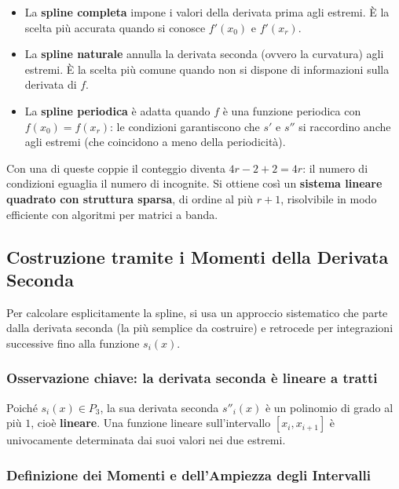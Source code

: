 \documentclass[a4paper,12pt]{article}
\theoremstyle{definition}
\theoremstyle{remark}
\begin{document}
\begin{itemize}
  \item La \textbf{spline completa} impone i valori della derivata prima
        agli estremi. È la scelta più accurata quando si conosce
        $f'(x_0)$ e $f'(x_r)$.
  \item La \textbf{spline naturale} annulla la derivata seconda (ovvero
        la curvatura) agli estremi. È la scelta più comune quando
        non si dispone di informazioni sulla derivata di $f$.
  \item La \textbf{spline periodica} è adatta quando $f$ è una funzione
        periodica con $f(x_0) = f(x_r)$: le condizioni garantiscono
        che $s'$ e $s''$ si raccordino anche agli estremi (che
        coincidono a meno della periodicità).
\end{itemize}

\noindent Con una di queste coppie il conteggio diventa
$4r - 2 + 2 = 4r$: il numero di condizioni eguaglia il numero di
incognite. Si ottiene così un \textbf{sistema lineare quadrato con
struttura sparsa}, di ordine al più $r + 1$, risolvibile in modo
efficiente con algoritmi per matrici a banda.

\subsection{Costruzione tramite i Momenti della Derivata Seconda}

Per calcolare esplicitamente la spline, si usa un approccio sistematico
che parte dalla derivata seconda (la più semplice da costruire) e
retrocede per integrazioni successive fino alla funzione $s_i(x)$.

\subsubsection*{Osservazione chiave: la derivata seconda è lineare a tratti}

Poiché $s_i(x) \in P_3$, la sua derivata seconda $s''_i(x)$ è un polinomio
di grado al più $1$, cioè \textbf{lineare}. Una funzione lineare
sull'intervallo $[x_i, x_{i+1}]$ è univocamente determinata dai suoi
valori nei due estremi.

\subsubsection*{Definizione dei Momenti e dell'Ampiezza degli Intervalli}
\end{document}
